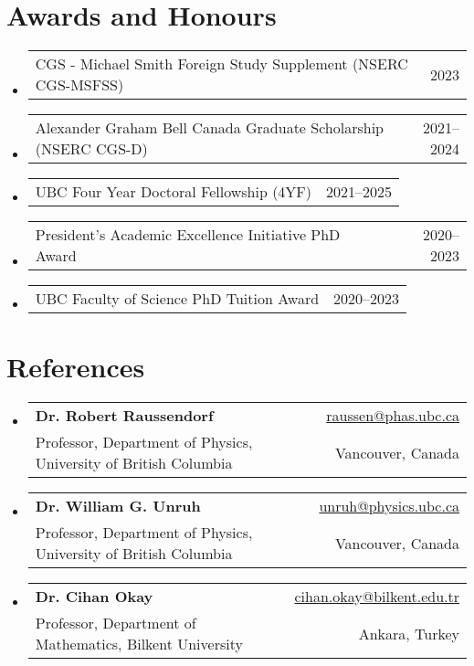 \documentclass[letterpaper,11pt]{article}
\makeatletter
\newcommand{\AwardsItem}[2]{
	\item{\vspace{-1pt}
		\begin{tabular*}{0.97\textwidth}{l@{\extracolsep{\fill}}r}
			{#1} & {#2}
		\end{tabular*}
		\vspace{-5pt}
	}
}
\newcommand{\ReferencesItem}[4]{
	\item{\vspace{-1pt}
		\begin{tabular*}{0.97\textwidth}{l@{\extracolsep{\fill}}r}
			\textbf{#1} & {#2}\\
			{#3} & {#4}
		\end{tabular*}
		\vspace{-5pt}
	}
}
\makeatother
\begin{document}
\section*{Awards and Honours}
\begin{itemize}[leftmargin=*]
	\AwardsItem{CGS - Michael Smith Foreign Study Supplement (NSERC CGS-MSFSS)}{2023}
	\AwardsItem{Alexander Graham Bell Canada Graduate Scholarship (NSERC CGS-D)}{2021--2024}
	\AwardsItem{UBC Four Year Doctoral Fellowship (4YF)}{2021--2025}
	\AwardsItem{President's Academic Excellence Initiative PhD Award}{2020--2023}
	\AwardsItem{UBC Faculty of Science PhD Tuition Award }{2020--2023}
\end{itemize}


\section*{References}
\begin{itemize}[leftmargin=*]
	\ReferencesItem{Dr. Robert Raussendorf}{\href{mailto:raussen@phas.ubc.ca}{raussen@phas.ubc.ca}}{Professor, Department of Physics, University of British Columbia}{Vancouver, Canada}
	
	\ReferencesItem{Dr. William G. Unruh}{\href{mailto:unruh@physics.ubc.ca}{unruh@physics.ubc.ca}}{Professor, Department of Physics, University of British Columbia}{Vancouver, Canada}
	
	\ReferencesItem{Dr. Cihan Okay}{\href{mailto:cihan.okay@bilkent.edu.tr}{cihan.okay@bilkent.edu.tr}}{Professor, Department of Mathematics, Bilkent University}{Ankara, Turkey}
	
\end{itemize}
\end{document}
